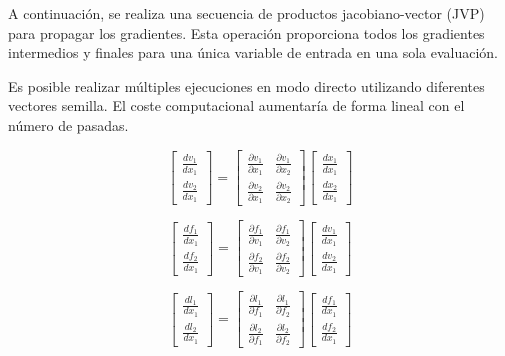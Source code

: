 A continuación, se realiza una secuencia de productos jacobiano-vector (JVP)
para propagar los gradientes. Esta operación proporciona todos los gradientes
intermedios y finales para una única variable de entrada en una sola
evaluación.

Es posible realizar múltiples ejecuciones en modo directo utilizando diferentes
vectores semilla. El coste computacional aumentaría de forma lineal con el
número de pasadas.

\begin{equation} \label{eq:direct_first_jac}
	\begin{bmatrix}
		\frac{dv_1}{dx_1} \\
		\frac{dv_2}{dx_1}
	\end{bmatrix}
	=
	\begin{bmatrix}
		\frac{\partial v_1}{\partial x_1} & \frac{\partial v_1}{\partial x_2} \\
		\frac{\partial v_2}{\partial x_1} & \frac{\partial v_2}{\partial x_2}
	\end{bmatrix}
	\begin{bmatrix}
		\frac{dx_1}{dx_1} \\
		\frac{dx_2}{dx_1}
	\end{bmatrix}
\end{equation}

\begin{equation} \label{eq:direct_second_jac}
	\begin{bmatrix}
		\frac{df_1}{dx_1} \\
		\frac{df_2}{dx_1}
	\end{bmatrix}
	=
	\begin{bmatrix}
		\frac{\partial f_1}{\partial v_1} & \frac{\partial f_1}{\partial v_2} \\
		\frac{\partial f_2}{\partial v_1} & \frac{\partial f_2}{\partial v_2}
	\end{bmatrix}
	\begin{bmatrix}
		\frac{dv_1}{dx_1} \\
		\frac{dv_2}{dx_1}
	\end{bmatrix}
\end{equation}

\begin{equation} \label{eq:direct_third_jac}
	\begin{bmatrix}
		\frac{dl_1}{dx_1} \\
		\frac{dl_2}{dx_1}
	\end{bmatrix}
	=
	\begin{bmatrix}
		\frac{\partial l_1}{\partial f_1} & \frac{\partial l_1}{\partial f_2} \\
		\frac{\partial l_2}{\partial f_1} & \frac{\partial l_2}{\partial f_2}
	\end{bmatrix}
	\begin{bmatrix}
		\frac{df_1}{dx_1} \\
		\frac{df_2}{dx_1}
	\end{bmatrix}
\end{equation}

